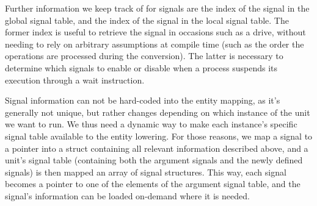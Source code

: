 Further information we keep track of for signals are the index of the signal in the global signal table, and the index of the signal in the local signal table. The former index is useful to retrieve the signal in occasions such as a drive, without needing to rely on arbitrary assumptions at compile time (such as the order the operations are processed during the conversion). The latter is necessary to determine which signals to enable or disable when a process suspends its execution through a wait instruction.

Signal information can not be hard-coded into the entity mapping, as it's generally not unique, but rather changes depending on which instance of the unit we want to run. We thus need a dynamic way to make each instance's specific signal table available to the entity lowering. For those reasons, we map a signal to a pointer into a struct containing all relevant information described above, and a unit's signal table (containing both the argument signals and the newly defined signals) is then mapped an array of signal structures. This way, each signal becomes a pointer to one of the elements of the argument signal table, and the signal's information can be loaded on-demand where it is needed.





